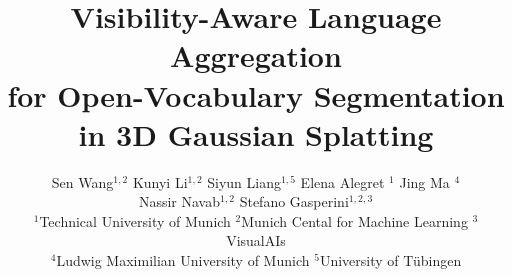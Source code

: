 \documentclass[10pt,twocolumn,letterpaper]{article}
\title{Visibility-Aware Language Aggregation\\for Open-Vocabulary Segmentation in 3D Gaussian Splatting}
\author{
    Sen Wang$^{1,2}$ \quad
    Kunyi Li$^{1,2}$ \quad
    Siyun Liang$^{1, 5}$\quad
    Elena Alegret $^{1}$ \quad 
    Jing Ma $^{4}$ \quad \\
    Nassir Navab$^{1,2}$ \quad
    Stefano Gasperini$^{1,2,3}$ \\ 
    {\normalsize $^1$Technical University of Munich} \quad
    {\normalsize $^2$Munich Cental for Machine Learning} \quad
    {\normalsize $^3$VisualAIs} \\
    {\normalsize $^4$Ludwig Maximilian University of Munich} \quad
    {\normalsize $^5$University of Tübingen} \quad\\
    }
\begin{document}
\maketitle
    






{
    \small
    
    
}


\end{document}

